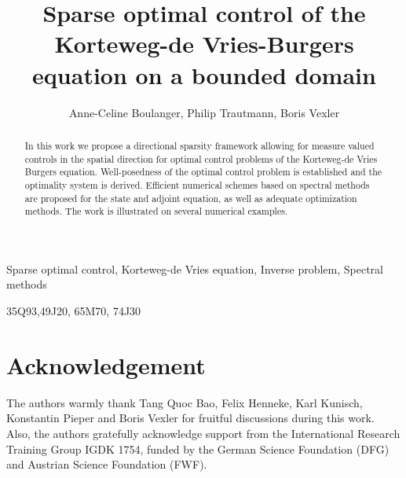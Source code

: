 \documentclass[draft,leqno,onefignum,onetabnum]{siamltex1213}
\title{Sparse optimal control of the Korteweg-de Vries-Burgers equation on a bounded domain}
\author{Anne-Celine Boulanger, Philip Trautmann, Boris Vexler}
\begin{document}
\maketitle


\begin{abstract}
In this work we propose a directional sparsity framework allowing for measure valued controls in the spatial
direction for optimal control problems of the Korteweg-de Vries Burgers equation. Well-posedness of the optimal control
problem is established and the optimality system is derived. Efficient numerical schemes based on spectral methods are proposed for the state and adjoint equation, as well as adequate optimization methods. The work is illustrated on several numerical examples.
\end{abstract}

\begin{keywords}Sparse optimal control, Korteweg-de Vries equation, Inverse problem, Spectral methods\end{keywords}

\begin{AMS}35Q93,49J20, 65M70, 74J30\end{AMS}










\section*{Acknowledgement}
The authors warmly thank Tang Quoc Bao, Felix Henneke, Karl Kunisch, Konstantin Pieper and Boris Vexler for fruitful discussions during this work. Also, the authors gratefully acknowledge support from the International Research Training Group IGDK 1754, funded by the German Science Foundation (DFG) and Austrian Science Foundation (FWF).




\end{document}

